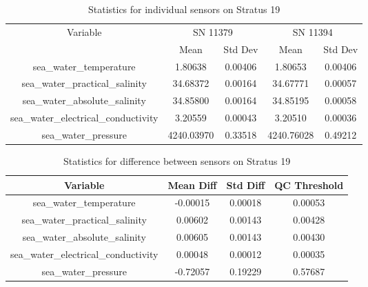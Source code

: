 \begin{table}[h]
\centering
\begin{tabular}{|c|c|c|c|c|}
\hline
Variable & \multicolumn{2}{c|}{SN 11379} & \multicolumn{2}{c|}{SN 11394} \\
& Mean & Std Dev & Mean & Std Dev \\
\hline
sea\_water\_temperature & 1.80638 & 0.00406 & 1.80653 & 0.00406 \\
sea\_water\_practical\_salinity & 34.68372 & 0.00164 & 34.67771 & 0.00057 \\
sea\_water\_absolute\_salinity & 34.85800 & 0.00164 & 34.85195 & 0.00058 \\
sea\_water\_electrical\_conductivity & 3.20559 & 0.00043 & 3.20510 & 0.00036 \\
sea\_water\_pressure & 4240.03970 & 0.33518 & 4240.76028 & 0.49212 \\
\hline
\end{tabular}
\caption{Statistics for individual sensors on Stratus 19}
\end{table}

\begin{table}[h]
\centering
\begin{tabular}{|c|c|c|c|}
\hline
Variable & Mean Diff & Std Diff & QC Threshold \\
\hline
sea\_water\_temperature & -0.00015 & 0.00018 & 0.00053 \\
sea\_water\_practical\_salinity & 0.00602 & 0.00143 & 0.00428 \\
sea\_water\_absolute\_salinity & 0.00605 & 0.00143 & 0.00430 \\
sea\_water\_electrical\_conductivity & 0.00048 & 0.00012 & 0.00035 \\
sea\_water\_pressure & -0.72057 & 0.19229 & 0.57687 \\
\hline
\end{tabular}
\caption{Statistics for difference between sensors on Stratus 19}
\end{table}
